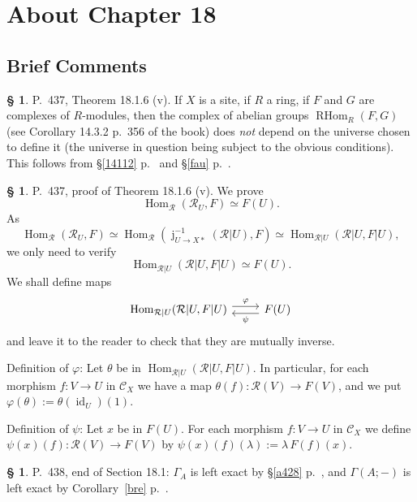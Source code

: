 \documentclass[12pt]{article}
\theoremstyle{remark}
\theoremstyle{definition}
\newtheorem{s}[thm]{\S}
\newcommand{\cc}{\mathcal}
\newcommand{\oo}{\operatorname}
\newcommand{\C}{\mathcal C}
\newcommand{\pp}{\varphi}
\DeclareMathOperator{\id}{id}
\DeclareMathOperator{\Hom}{Hom}
\DeclareMathOperator{\RHom}{RHom}
\begin{document}
\section{About Chapter 18} 

\subsection{Brief Comments}

%

\begin{s}
P.~437, Theorem 18.1.6 (v). If $X$ is a site, if $R$ a ring, if $F$ and $G$ are complexes of $R$-modules, then the complex of abelian groups $\RHom_R(F,G)$ (see Corollary 14.3.2 p.~356 of the book) does {\em not} depend on the universe chosen to define it (the universe in question being subject to the obvious conditions). This follows from \S\ref{14112} p.~\pageref{14112} and \S\ref{fau} p.~\pageref{fau}. 
\end{s} 

%

\begin{s} 
P.~437, proof of Theorem 18.1.6 (v). We prove 
$$
\Hom_{\cc R}(\cc R_U,F)\simeq F(U).
$$ 
As 
$$
\Hom_{\cc R}(\cc R_U,F)\simeq\Hom_{\cc R}(\oo j_{U\to X*}^{-1}(\cc R|U),F)\simeq
\Hom_{\cc R|U}(\cc R|U,F|U), 
$$ 
we only need to verify 
$$
\Hom_{\cc R|U}(\cc R|U,F|U)\simeq F(U).
$$ 
We shall define maps 
$$
\begin{tikzcd}
\Hom_{\cc R|U}(\cc R|U,F|U)\ar[yshift=0.7ex]{r}{\pp}&F(U)\ar[yshift=-0.7ex]{l}{\psi}
\end{tikzcd}
$$ 
and leave it to the reader to check that they are mutually inverse. 

Definition of $\pp$: Let $\theta$ be in $\Hom_{\cc R|U}(\cc R|U,F|U)$. In particular, for each morphism $f:V\to U$ in $\C_X$ we have a map $\theta(f):\cc R(V)\to F(V)$, and we put $\pp(\theta):=\theta(\id_U)(1)$. 

Definition of $\psi$: Let $x$ be in $F(U)$. For each morphism $f:V\to U$ in $\C_X$ we define $\psi(x)(f):\cc R(V)\to F(V)$ by $\psi(x)(f)(\lambda):=\lambda\,F(f)(x)$.
\end{s}

%

\begin{s}\label{a438}
P.~438, end of Section 18.1: $\Gamma_A$ is left exact by \S\ref{a428} p.~\pageref{a428}, and $\Gamma(A;-)$ is left exact by Corollary~\ref{bre} p.~\pageref{bre}.
\end{s} 
\end{document}
